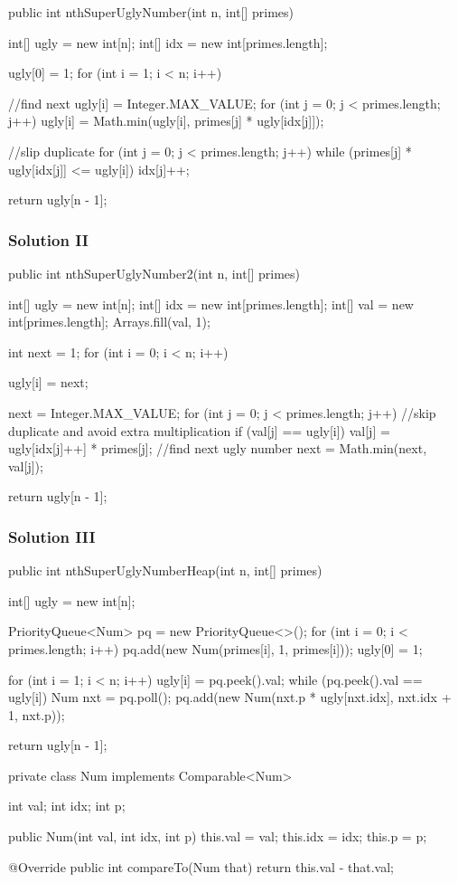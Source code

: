 \begin{Code}
public int nthSuperUglyNumber(int n, int[] primes) {
    int[] ugly = new int[n];
    int[] idx = new int[primes.length];

    ugly[0] = 1;
    for (int i = 1; i < n; i++) {
        //find next
        ugly[i] = Integer.MAX_VALUE;
        for (int j = 0; j < primes.length; j++)
            ugly[i] = Math.min(ugly[i], primes[j] * ugly[idx[j]]);

        //slip duplicate
        for (int j = 0; j < primes.length; j++) {
            while (primes[j] * ugly[idx[j]] <= ugly[i]) idx[j]++;
        }
    }

    return ugly[n - 1];
}

\end{Code}

\newpage
\subsubsection{Solution II}
\begin{Code}
public int nthSuperUglyNumber2(int n, int[] primes) {
    int[] ugly = new int[n];
    int[] idx = new int[primes.length];
    int[] val = new int[primes.length];
    Arrays.fill(val, 1);

    int next = 1;
    for (int i = 0; i < n; i++) {
        ugly[i] = next;

        next = Integer.MAX_VALUE;
        for (int j = 0; j < primes.length; j++) {
            //skip duplicate and avoid extra multiplication
            if (val[j] == ugly[i]) val[j] = ugly[idx[j]++] * primes[j];
            //find next ugly number
            next = Math.min(next, val[j]);
        }
    }

    return ugly[n - 1];
}
\end{Code}

\newpage
\subsubsection{Solution III}

\begin{Code}
public int nthSuperUglyNumberHeap(int n, int[] primes) {
    int[] ugly = new int[n];

    PriorityQueue<Num> pq = new PriorityQueue<>();
    for (int i = 0; i < primes.length; i++) pq.add(new Num(primes[i], 1, primes[i]));
    ugly[0] = 1;

    for (int i = 1; i < n; i++) {
        ugly[i] = pq.peek().val;
        while (pq.peek().val == ugly[i]) {
            Num nxt = pq.poll();
            pq.add(new Num(nxt.p * ugly[nxt.idx], nxt.idx + 1, nxt.p));
        }
    }

    return ugly[n - 1];
}

private class Num implements Comparable<Num> {
    int val;
    int idx;
    int p;

    public Num(int val, int idx, int p) {
        this.val = val;
        this.idx = idx;
        this.p = p;
    }

    @Override
    public int compareTo(Num that) {
        return this.val - that.val;
    }
}
\end{Code}

